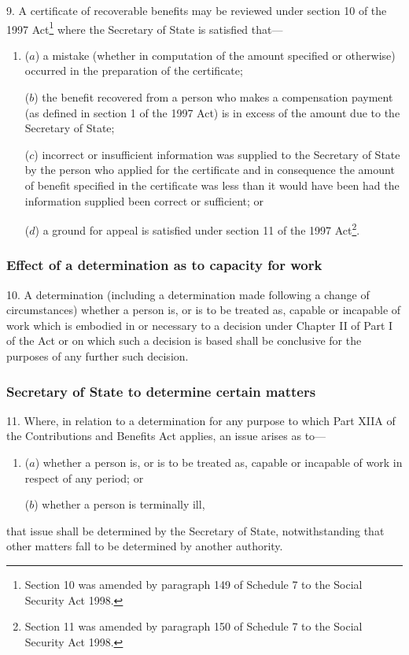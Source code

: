 \documentclass[12pt,a4paper]{article}
\begin{document}
\renewcommand\parthead{--- Part II Chapter III}

9.  A certificate of recoverable benefits may be reviewed under section 10 of the 1997 Act\footnote{\frenchspacing Section 10 was amended by paragraph 149 of Schedule 7 to the Social Security Act 1998.} where the Secretary of State is satisfied that—
\begin{enumerate}\item[]
($a$) a mistake (whether in computation of the amount specified or otherwise) occurred in the preparation of the certificate;

($b$) the benefit recovered from a person who makes a compensation payment (as defined in section 1 of the 1997 Act) is in excess of the amount due to the Secretary of State;

($c$) incorrect or insufficient information was supplied to the Secretary of State by the person who applied for the certificate and in consequence the amount of benefit specified in the certificate was less than it would have been had the information supplied been correct or sufficient; or

($d$) a ground for appeal is satisfied under section 11 of the 1997 Act\footnote{\frenchspacing Section 11 was amended by paragraph 150 of Schedule 7 to the Social Security Act 1998.}.
\end{enumerate}

\subsubsection[10. Effect of a determination as to capacity for work]{Effect of a determination as to capacity for work}

10.  A determination (including a determination made following a change of circumstances) whether a person is, or is to be treated as, capable or incapable of work which is embodied in or necessary to a decision under Chapter II of Part I of the Act or on which such a decision is based shall be conclusive for the purposes of any further such decision.

\subsubsection[11. Secretary of State to determine certain matters]{Secretary of State to determine certain matters}

11.  Where, in relation to a determination for any purpose to which Part XIIA of the Contributions and Benefits Act applies, an issue arises as to—
\begin{enumerate}\item[]
($a$) whether a person is, or is to be treated as, capable or incapable of work in respect of any period; or

($b$) whether a person is terminally ill,
\end{enumerate}
that issue shall be determined by the Secretary of State, notwithstanding that other matters fall to be determined by another authority.
\end{document}
